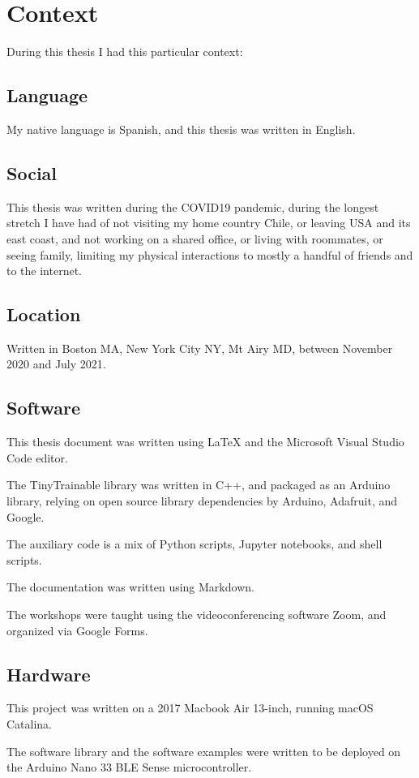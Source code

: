 \chapter{Context}

During this thesis I had this particular context:

\section{Language}

My native language is Spanish, and this thesis was written in English.

\section{Social}

This thesis was written during the COVID19 pandemic, during the longest stretch I have had of not visiting my home country Chile, or leaving USA and its east coast, and not working on a shared office, or living with roommates, or seeing family, limiting my physical interactions to mostly a handful of friends and to the internet.

\section{Location}

Written in Boston MA, New York City NY, Mt Airy MD, between November 2020 and July 2021.

\section{Software}

This thesis document was written using LaTeX and the Microsoft Visual Studio Code editor.

The TinyTrainable library was written in C++, and packaged as an Arduino library, relying on open source library dependencies by Arduino, Adafruit, and Google.

The auxiliary code is a mix of Python scripts, Jupyter notebooks, and shell scripts.

The documentation was written using Markdown.

The workshops were taught using the videoconferencing software Zoom, and organized via Google Forms.

\section{Hardware}

This project was written on a 2017 Macbook Air 13-inch, running macOS Catalina.

The software library and the software examples were written to be deployed on the Arduino Nano 33 BLE Sense microcontroller.

\newpage
